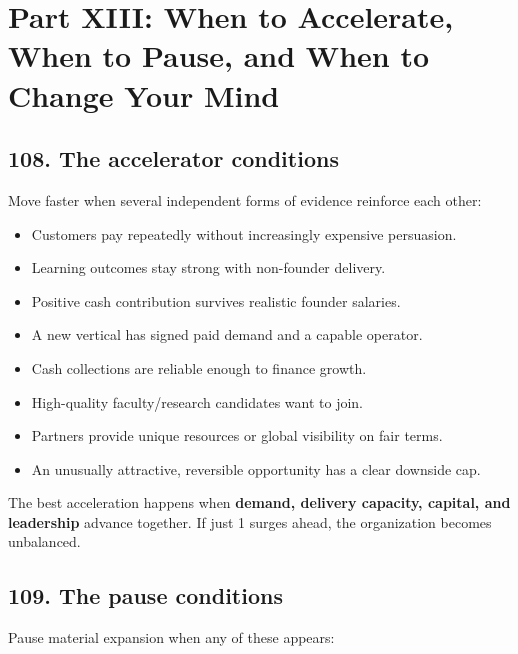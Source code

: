 
\section*{Part XIII: When to Accelerate, When to Pause, and When to Change Your Mind}

\subsection{108. The accelerator conditions}

Move faster when several independent forms of evidence reinforce each other:

\begin{itemize}[leftmargin=*,itemsep=1.5pt]
  \item Customers pay repeatedly without increasingly expensive persuasion.
  \item Learning outcomes stay strong with non-founder delivery.
  \item Positive cash contribution survives realistic founder salaries.
  \item A new vertical has signed paid demand and a capable operator.
  \item Cash collections are reliable enough to finance growth.
  \item High-quality faculty/\allowbreak research candidates want to join.
  \item Partners provide unique resources or global visibility on fair terms.
  \item An unusually attractive, reversible opportunity has a clear downside cap.
\end{itemize}

The best acceleration happens when \textbf{demand, delivery capacity, capital, and leadership} advance together. If just 1 surges ahead, the organization becomes unbalanced.

\subsection{109. The pause conditions}

Pause material expansion when any of these appears:

